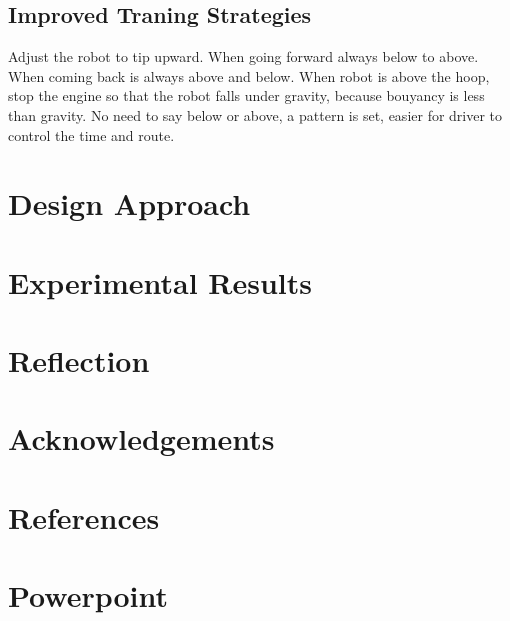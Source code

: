 \documentclass[11pt, oneside]{article}   	%
\begin{document}
\subsection{Improved Traning Strategies}
Adjust the robot to tip upward. When going forward always below to above. When coming back is always above and below. When robot is above the hoop, stop the engine so that the robot falls under gravity, because bouyancy is less than gravity. No need to say below or above, a pattern is set, easier for driver to control the time and route.



\section{Design Approach}
\section{Experimental Results}
\section{Reflection}
\section{Acknowledgements}
\section*{References}
\section*{Powerpoint}
\end{document}
